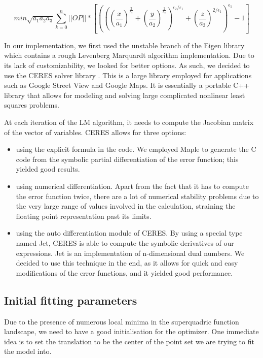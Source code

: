 \documentclass{article}
\begin{document}
\begin{equation}
min \sqrt {a_1 a_2 a_3} \sum_{k=0}^n ||OP|| * \left[ \left( \left( \left( \frac{x}{a_1}\right)^{\frac{2}{\epsilon_2}} + \left( \frac{y}{a_2} \right) ^{\frac{2}{\epsilon_2}} \right)^{\epsilon_2 / \epsilon_1} + \left( \frac{z}{a_3} \right) ^{2/\epsilon_1} \right) ^{\epsilon_1} - 1 \right]
\end{equation}


In our implementation, we first used the unstable branch of the Eigen library \cite{eigenweb} which contains a rough Levenberg Marquardt algorithm implementation. Due to its lack of customizability, we looked for better options. As such, we decided to use the CERES solver library \cite{ceres-solver}. This is a large library employed for applications such as Google Street View and Google Maps. It is essentially a portable C++ library that allows for modeling and solving large complicated nonlinear least squares problems.

At each iteration of the LM algorithm, it needs to compute the Jacobian matrix of the vector of variables. CERES allows for three options:

\begin{itemize}
	\item {using the explicit formula in the code. We employed Maple to generate the C code from the symbolic partial differentiation of the error function; this yielded good results.}
	\item {using numerical differentiation. Apart from the fact that it has to compute the error function twice, there are a lot of numerical stability problems due to the very large range of values involved in the calculation, straining the floating point representation past its limits.}
	\item {using the auto differentiation module of CERES. By using a special type named Jet, CERES is able to compute the symbolic derivatives of our expressions. Jet is an implementation of n-dimensional dual numbers. We decided to use this technique in the end, as it allows for quick and easy modifications of the error functions, and it yielded good performance.}
\end{itemize}

\subsection*{Initial fitting parameters}

Due to the presence of numerous local minima in the superquadric function landscape, we need to have a good initialisation for the optimizer. One immediate idea is to set the translation to be the center of the point set we are trying to fit the model into.
\end{document}
